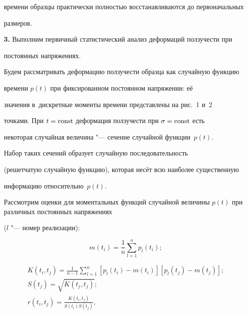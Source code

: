 времени образцы практически полностью восстанавливаются до первоначальных 

размеров.



\textbf{3.} Выполним первичный статистический анализ деформаций ползучести при 

постоянных напряжениях.



Будем рассматривать деформацию ползучести образца как случайную функцию 

времени $p(t)$ при фиксированном постоянном напряжении: её 

значения в~дискретные моменты времени представлены на рис.~1 и~2 

точками. При $t = \rm const$ деформация ползучести при $\sigma = \rm const$ есть 

некоторая случайная величина "--- сечение случайной функции~$p( t )$. 

Набор таких сечений образует случайную последовательность 

(решетчатую случайную функцию), которая несёт всю наиболее существенную 

информацию относительно~$p(t)$.



Рассмотрим оценки для моментальных функций случайной величины $p( t )$ при различных постоянных напряжениях 

($l$ "--- номер реализации):

\begin{equation}

\label{radch:eq1}

m\left( {t_i } \right) = \frac{1}{n}\sum\limits_{l = 1}^n {p _l 

\left( {t_i } \right)} ;

\end{equation}

\begin{gather}

\label{radch:eq2}

K\left( {t_i ,t_j } \right) = \frac{1}{n - 1}\sum\limits_{l = 1}^n {\left[ 

{p_l \left( {t_i } \right) - m\left( {t_i } \right)} \right]

\left[ {p_l \left( {t_j } \right) - m\left( {t_j } \right)} \right]} ;

\\



\label{radch:eq3}

S\left( {t_j } \right) = \sqrt {K\left( {t_j ,t_j } \right)} ;\\

\label{radch:eq4}

r\left( {t_i ,t_j } \right) = \frac{K\left( {t_i ,t_j } \right)}{S\left( 

{t_i } \right)S\left( {t_j } \right)},

\end{gather}

